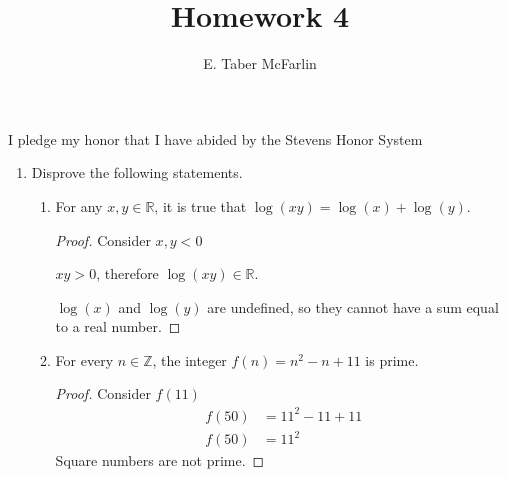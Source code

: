 \documentclass[12pt,a4paper,reqno,parskip=full]{amsart}
\numberwithin{equation}{section}
\theoremstyle{plain}
\theoremstyle{definition}
\begin{document}
\title{Homework 4}

\author{E. Taber McFarlin}

\maketitle

I pledge my honor that I have abided by the Stevens Honor System

\begin{enumerate}
  \item Disprove the following statements.
        \begin{enumerate}
          \item For any $x,y\in\mathbb{R}$, it is true that $\log(xy)=\log(x)+\log(y)$.
                \begin{proof} Consider $x,y<0$

                  $xy > 0$, therefore $\log(xy)\in\mathbb{R}$.

                  $\log(x)$ and $\log(y)$ are undefined, so they cannot have a sum equal to a real number.
                \end{proof}

          \item For every $n\in\mathbb{Z}$, the integer $f(n)=n^2-n+11$ is prime.
                \begin{proof} Consider $f(11)$
                  \begin{align*}
                    f(50) & = 11^2 - 11 + 11 \\
                    f(50) & = 11^2
                  \end{align*}
                  Square numbers are not prime.
                \end{proof}
        \end{enumerate}


\end{enumerate}
\end{document}
